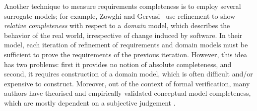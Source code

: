 Another technique to measure requirements completeness is to employ several surrogate models; for example, Zowghi and Gervasi~\cite{zowghi2003three} use refinement to show {\em relative completeness} with respect to a {\em domain} model, which describes the behavior of the real world, irrespective of change induced by software.  In their model, each iteration of refinement of requirements and domain models must be sufficient to prove the requirements of the previous iteration.  However, this idea has two problems: first it provides no notion of absolute completeness, and second, it requires construction of a domain model, which is often difficult and/or expensive to construct. Moreover, out of the context of formal verification, many authors have theorised and empirically validated conceptual model completeness, which are mostly dependent on a subjective judgement \cite{drechsler2012completeness, firesmith2005your, chang2007finding,katta2013investigating, zowghi2003three, espana2009evaluating}.

%

%


